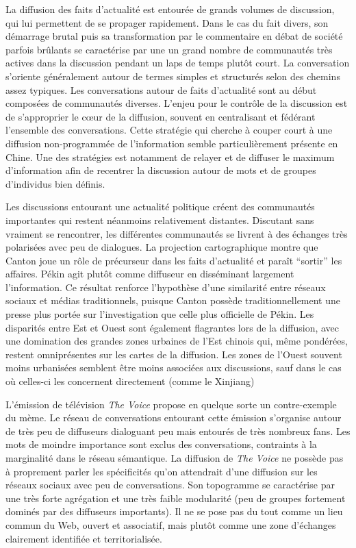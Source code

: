 La diffusion des faits d{\textquoteright}actualité est entourée de grands volumes de discussion, qui lui permettent de se propager rapidement. Dans le cas du fait divers, son démarrage brutal puis sa transformation par le commentaire en débat de société parfois brûlants se caractérise par une un grand nombre de communautés très actives dans la discussion pendant un laps de temps plutôt court. La conversation s'oriente généralement autour de termes simples et structurés selon des chemins assez typiques. Les conversations autour de faits d'actualité sont au début composées de communautés diverses. L'enjeu pour le contrôle de la discussion est de s'approprier le cœur de la diffusion, souvent en centralisant et fédérant l'ensemble des conversations. Cette stratégie qui cherche à couper court à une diffusion non-programmée de l'information semble particulièrement présente en Chine. Une des stratégies est notamment de relayer et de diffuser le maximum d'information afin de recentrer la discussion autour de mots et de groupes d{\textquoteright}individus bien définis. 

Les discussions entourant une actualité politique créent des communautés importantes qui restent néanmoins relativement distantes. Discutant sans vraiment se rencontrer, les différentes communautés se livrent à des échanges très polarisées avec peu de dialogues. La projection cartographique montre que Canton joue un r\^ole de précurseur dans les faits d{\textquoteright}actualité et para\^it {\textquotedblleft}sortir{\textquotedblright} les affaires. Pékin agit plutôt comme diffuseur en disséminant largement l{\textquoteright}information. Ce résultat renforce l{\textquoteright}hypothèse d{\textquoteright}une similarité entre réseaux sociaux et médias traditionnels, puisque Canton possède traditionnellement une presse plus portée sur l'investigation que celle plus officielle de Pékin. Les disparités entre Est et Ouest sont également flagrantes lors de la diffusion, avec une domination des grandes zones urbaines de l{\textquoteright}Est chinois qui, même pondérées, restent omniprésentes sur les cartes de la diffusion. Les zones de l{\textquoteright}Ouest souvent moins urbanisées semblent être moins associées aux discussions, sauf dans le cas où celles-ci les concernent directement (comme le Xinjiang) 

L{\textquoteright}émission de télévision \textit{The Voice} propose en quelque sorte un contre-exemple du mème. Le réseau de conversations entourant cette émission s'organise autour de très peu de diffuseurs dialoguant peu mais entourés de très nombreux fans. Les mots de moindre importance sont exclus des conversations, contraints à la marginalité dans le réseau sémantique. La diffusion de \textit{The Voice} ne possède pas à proprement parler les spécificités qu'on attendrait d'une diffusion sur les réseaux sociaux avec peu de conversations. Son topogramme se caractérise par une très forte agrégation et une très faible modularité (peu de groupes fortement dominés par des diffuseurs importants). Il ne se pose pas du tout comme un lieu commun du Web, ouvert et associatif,  mais plut\^ot comme une zone d'échanges clairement identifiée et territorialisée. 

